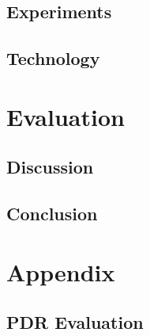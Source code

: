 \chapter{Experiments}










\chapter{Technology}



\part{Evaluation}
\chapter{Discussion}


\chapter{Conclusion}

\newpage
\newpage



\printbibliography

\part{Appendix}
\appendix
\chapter{PDR Evaluation}\label{PDR:results}




